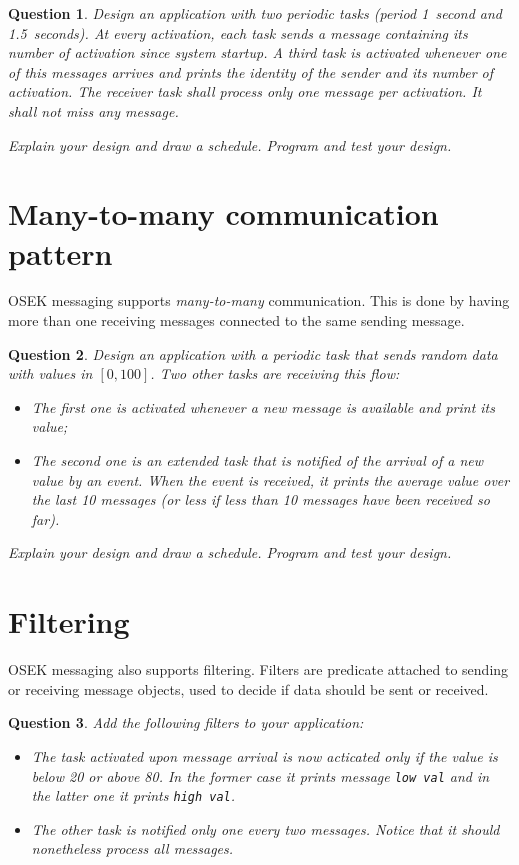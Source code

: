 \documentclass[11pt]{report}
\newtheorem{ex}{Question}
\begin{document}
\begin{ex}
  Design an application with two periodic tasks (period \SI{1}{second} and \SI{1.5}{seconds}). At every activation, each task sends a message containing its number of activation since system startup.
  A third task is activated whenever one of this messages arrives and prints the identity of the sender and its number of activation.
  The receiver task shall process only one message per activation.
  It shall not miss any message.

  Explain your design and draw a schedule. Program and test your design.
\end{ex}

\section{Many-to-many communication pattern}

OSEK messaging supports \emph{many-to-many} communication.
This is done by having more than one receiving messages connected to the same sending message.

\begin{ex}
  Design an application with a periodic task that sends random data with values in $[0,100]$.
  Two other tasks are receiving this flow:
  \begin{itemize}
    \item
      The first one is activated whenever a new message is available and print its value;
    \item
      The second one is an extended task that is notified of the arrival of a new value by an event.
      When the event is received, it prints the average value over the last 10 messages (or less if less than 10 messages have been received so far).
  \end{itemize}

  Explain your design and draw a schedule. Program and test your design.
\end{ex}

\section{Filtering}

OSEK messaging also supports filtering.
Filters are predicate attached to sending or receiving message objects, used to decide if data should be sent or received.

\begin{ex}
  Add the following filters to your application:
  \begin{itemize}
    \item
      The task activated upon message arrival is now acticated only if the value is below \num{20} or above \num{80}.
      In the former case it prints message \verb-low val- and in the latter one it prints \verb-high val-.
    \item
      The other task is notified only one every two messages.
      Notice that it should nonetheless process all messages.
  \end{itemize}
\end{ex}
\end{document}
